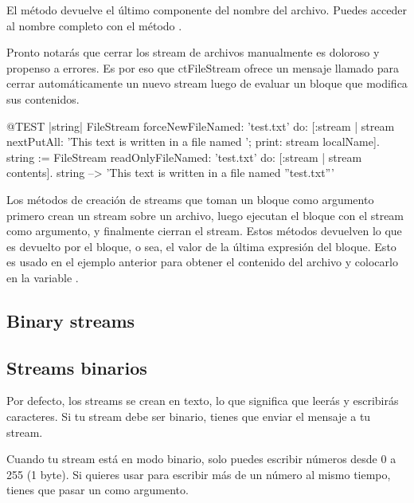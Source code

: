 \documentclass[a4paper,10pt,twoside]{book}
\begin{document}
{%

El m\'etodo  devuelve el \'ultimo componente del nombre del archivo. 
Puedes acceder al nombre completo con el m\'etodo .
 
Pronto notar\'as que cerrar los stream de archivos manualmente es doloroso y propenso a errores. 
Es por eso que ct{FileStream} ofrece un mensaje llamado  
para cerrar autom\'aticamente un nuevo stream luego de evaluar un bloque que modifica sus contenidos. 

 
\begin{code}{@TEST |string|}
FileStream
    forceNewFileNamed: 'test.txt'
    do: [:stream |
        stream
            nextPutAll: 'This text is written in a file named ';
            print: stream localName].
string := FileStream
            readOnlyFileNamed: 'test.txt'
            do: [:stream | stream contents].
string --> 'This text is written in a file named ''test.txt'''
\end{code}

Los m\'etodos de creaci\'on de streams que toman un bloque como argumento
primero crean un stream sobre un archivo, luego ejecutan el bloque con 
el stream como argumento, y finalmente cierran el stream. Estos m\'etodos
devuelven lo que es devuelto por el bloque, o sea, el valor de la \'ultima
expresi\'on del bloque. Esto es usado en el ejemplo anterior para obtener
el contenido del archivo y colocarlo en la variable .

\subsection{Binary streams}
\subsection{Streams binarios}

Por defecto, los streams se crean en texto, lo que significa que leer\'as 
y escribir\'as caracteres. Si tu stream debe ser binario, 
tienes que enviar el mensaje  a tu stream.

Cuando tu stream est\'a en modo binario, solo puedes escribir n\'umeros
desde 0 a 255 (1 byte). Si quieres usar  para escribir
m\'as de un n\'umero al mismo tiempo, tienes que pasar un  como argumento. 
 
}
\end{document}
